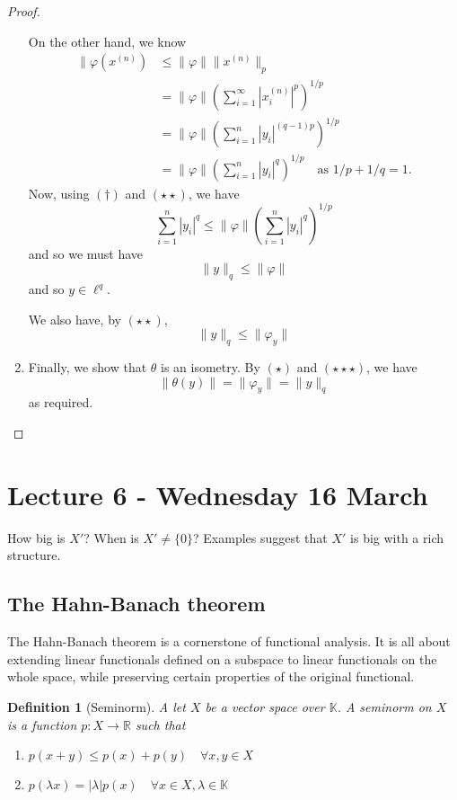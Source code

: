 \documentclass[12pt, oneside, a4paper]{article}
\theoremstyle{dfn}
\newtheorem{dfn}[thm]{Definition}
\renewcommand{\phi}{\varphi}
\newcommand{\R}{\mathbb{R}}
\newcommand{\K}{\mathbb{K}}
\begin{document}
\begin{proof}
\begin{enumerate}[(1)]
        On the other hand, we know \begin{align*}
            \| \phi( x^{(n)}) &\leq \| \phi \| \| x^{(n)} \|_p \\
                            &= \| \phi \| \left( \sum_{i=1}^\infty |x_i^{(n)}|^p \right)^{1/p} \\
                            &= \| \phi \| \left( \sum_{i = 1}^n |y_i |^{(q-1)p} \right)^{1/p} \\
                            &= \| \phi \| \left( \sum_{i=1}^n |y_i |^q \right)^{1/p} \quad \text{as $1/p + 1/q = 1$.} \tag{$\star \star$}
        \end{align*}
        Now, using $(\dagger)$ and $(\star \star)$, we have \[
             \sum_{i=1}^n |y_i|^q  \leq \| \phi \| \left( \sum_{i=1}^n | y_i |^q \right)^{1/p} 
        \] and so we must have \[
            \| y \|_q \leq \| \phi \| \tag{$\star \star \star$}
        \]
        and so $y \in \ell^q$.
        
        We also have, by $(\star \star)$,\[
            \| y \|_q \leq \| \phi_y \|
        \] 
        \item Finally, we show that $\theta$ is an isometry.  By $(\star)$ and $(\star \star \star)$, we have \[
            \| \theta(y) \| = \| \phi_y \| = \| y \|_q 
        \] as required.\qedhere
         
    \end{enumerate} 
\end{proof} 

\section{Lecture 6 - Wednesday 16 March} %
\label{sec:lecture_6_wednesday_16_march}
How big is $X'$?  When is $X' \neq \{ 0 \}$?  Examples suggest that $X'$ is big with a rich structure.  

\subsection{The Hahn-Banach theorem} %
\label{sub:the_hahn_banach_theorem}
The Hahn-Banach theorem is a cornerstone of functional analysis.  It is all about extending linear functionals defined on a subspace to linear functionals on the whole space, while preserving certain properties of the original functional.

\begin{dfn}[Seminorm]
A let $X$ be a vector space over $\K$.  A seminorm on $X$ is a function $p : X \rightarrow \R$ such that 
\begin{enumerate}[(1)]
    \item $p(x+y) \leq p(x) + p(y) \quad \forall x,y \in X$
    \item $p(\lambda x) = | \lambda | p(x) \quad \forall x \in X, \lambda \in \K$
\end{enumerate}
\end{dfn}
\end{document}
